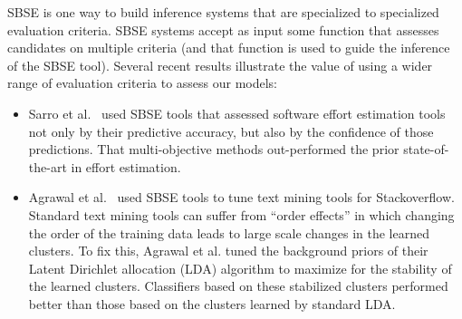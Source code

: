 \documentclass[table, xcdraw, sigconf,review, anonymous]{acmart}
\begin{document}
SBSE is one way to build inference systems that are specialized to specialized evaluation
criteria. SBSE systems accept as input some function that assesses candidates on multiple
criteria (and that function is used to   guide the inference of the SBSE tool).
Several recent results illustrate the value of using a wider range of evaluation criteria
to assess our models:
\begin{itemize}
\item
Sarro et al.~\cite{sarro2016multi}  used SBSE tools that assessed software effort estimation tools
not only by their predictive accuracy, but also by the confidence of those predictions.
That multi-objective methods out-performed the prior state-of-the-art in effort estimation.
\item
Agrawal et al.~\cite{agrawalwrong} used SBSE tools to tune text mining tools for Stackoverflow.
Standard text mining tools can suffer from ``order effects'' in which changing the order
of the training data leads to large scale changes in the learned clusters.
To fix this, Agrawal et al. tuned the background priors
of their Latent Dirichlet allocation (LDA) algorithm to maximize for the stability
of the learned clusters.  Classifiers based on these stabilized clusters performed better than those based on the clusters learned by standard LDA.
\end{itemize}












\end{document}
